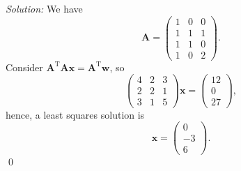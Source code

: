 \documentclass{article}
\begin{document}
\newline
\newline\textit{Solution:} We have \[\mathbf{A}=\begin{pmatrix}1&0&0\\1&1&1\\1&1&0\\1&0&2\end{pmatrix}.\] Consider $\mathbf{A}^\text{T}\mathbf{Ax}=\mathbf{A}^\text{T}\mathbf{w}$, so \[\begin{pmatrix}4&2&3\\2&2&1\\3&1&5\end{pmatrix}\mathbf{x}=\begin{pmatrix}12\\0\\27\end{pmatrix},\] hence, a least squares solution is \[\mathbf{x}=\begin{pmatrix}0\\-3\\6\end{pmatrix}.\]\qed
\end{document}
